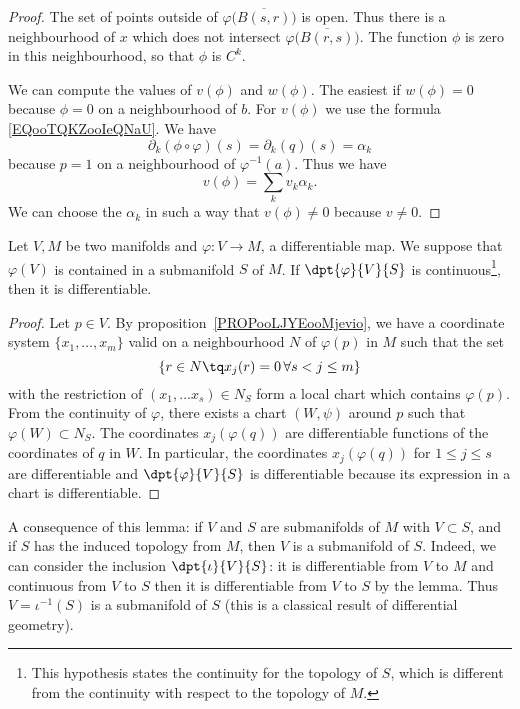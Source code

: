 \begin{proof}
	The set of points outside of \( \varphi\big( \overline{ B(s,r) } \big)\) is open. Thus there is a neighbourhood of \( x\) which does not intersect \( \varphi\big( \overline{ B(r,s) } \big)\). The function \( \phi\) is zero in this neighbourhood, so that \( \phi\) is \(  C^k\).

	We can compute the values of \( v(\phi)\) and \( w(\phi)\). The easiest if \( w(\phi)=0\) because \( \phi=0\) on a neighbourhood of \( b\). For \( v(\phi)\) we use the formula \ref{EQooTQKZooIeQNaU}. We have
	\begin{equation}
		\partial_k(\phi\circ\varphi)(s)=\partial_k(q)(s)=\alpha_k
	\end{equation}
	because \( p=1\) on a neighbourhood of \( \varphi^{-1}(a)\). Thus we have
	\begin{equation}
		v(\phi)=\sum_kv_k\alpha_k.
	\end{equation}
	We can choose the \( \alpha_k\) in such a way that \( v(\phi)\neq 0\) because \( v\neq 0\).
\end{proof}

\begin{lemma}\label{lem:var_cont_diff}
	Let $V,M$ be two manifolds and $\varphi\colon V\to M$, a differentiable map. We suppose that $\varphi(V)$ is contained in a submanifold $S$ of $M$. If $\dpt{\varphi}{V}{S}$ is continuous\footnote{This hypothesis states the continuity for the topology of \( S\), which is different from the continuity with respect to the topology of \( M\).}, then it is differentiable.
\end{lemma}

\begin{proof}
	Let $p\in V$. By proposition~\ref{PROPooLJYEooMjevio}, we have  a coordinate system $\{x_1,\ldots,x_m\}$ valid on a neighbourhood $N$ of $\varphi(p)$ in $M$ such that the set
	\[
		\{r\in N\tq x_j(r)=0\, \forall s<j\leq m  \}
	\]
	with the restriction of $(x_1,\ldots x_s)\in N_S$ form a local chart which contains $\varphi(p)$. From the continuity of $\varphi$, there exists a chart $(W,\psi)$ around $p$ such that $\varphi(W)\subset N_S$. The coordinates $x_j(\varphi(q))$ are differentiable functions of  the coordinates of $q$ in $W$. In particular, the coordinates $x_j(\varphi(q))$ for $1\leq j\leq s$ are differentiable and $\dpt{\varphi}{V}{S}$ is differentiable because its expression in a chart is differentiable.
\end{proof}

A consequence of this lemma: if $V$ and $S$ are submanifolds of $M$ with $V\subset S$, and if $S$ has the induced topology from $M$, then $V$ is a submanifold of $S$. Indeed, we can consider the inclusion $\dpt{\iota}{V}{S}$: it is differentiable from $V$ to $M$ and continuous from $V$ to $S$ then it is differentiable from $V$ to $S$ by the lemma. Thus $V=\iota^{-1}(S)$ is a submanifold of $S$ (this is a classical result of differential geometry).


